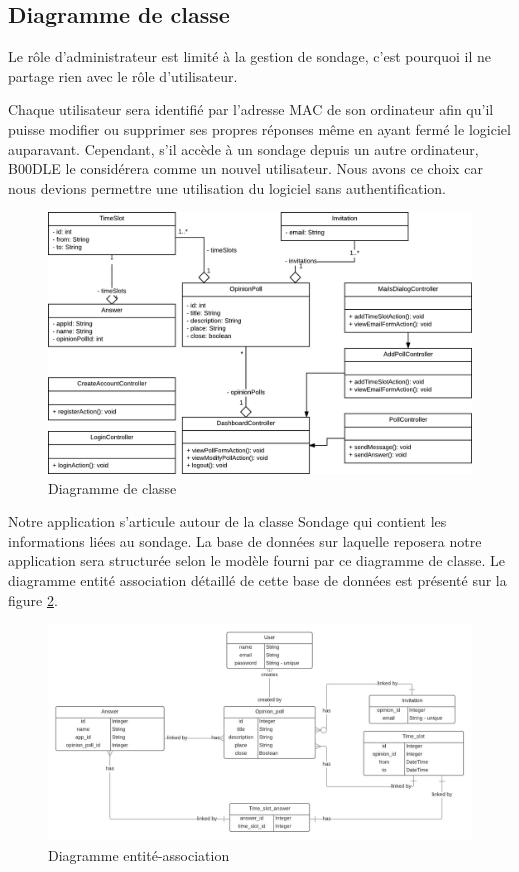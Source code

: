 \documentclass[titlepage]{report}
\begin{document}
\subsection{Diagramme de classe}

\par Le rôle d'administrateur est limité à la gestion de sondage, c'est pourquoi il ne partage rien avec le rôle d'utilisateur. 
\par Chaque utilisateur sera identifié par l'adresse MAC de son ordinateur afin qu'il puisse modifier ou supprimer ses propres réponses même en ayant fermé le logiciel auparavant. 
Cependant, s'il accède à un sondage depuis un autre ordinateur, B00DLE le considérera comme un nouvel utilisateur. Nous avons ce choix car nous devions permettre une utilisation du logiciel sans authentification.

\begin{figure}[ht]
	\caption{Diagramme de classe}
	\label{diagramme_classes}
	\centering
	\includegraphics[width=\textwidth]{figures/diagrammes/classes.png}
\end{figure}

\par Notre application s'articule autour de la classe Sondage qui contient les informations liées au sondage. 
La base de données sur laquelle reposera notre application sera structurée selon le modèle fourni par ce diagramme de classe. 
Le diagramme entité association détaillé de cette base de données est présenté sur la figure \ref{diagramme_entiteAssociation}.

\begin{figure}[h]
	\caption{Diagramme entité-association}
	\label{diagramme_entiteAssociation}
	\centering
	\includegraphics[width=\textwidth]{figures/diagrammes/entiteAssociation.png}
\end{figure}
\end{document}
